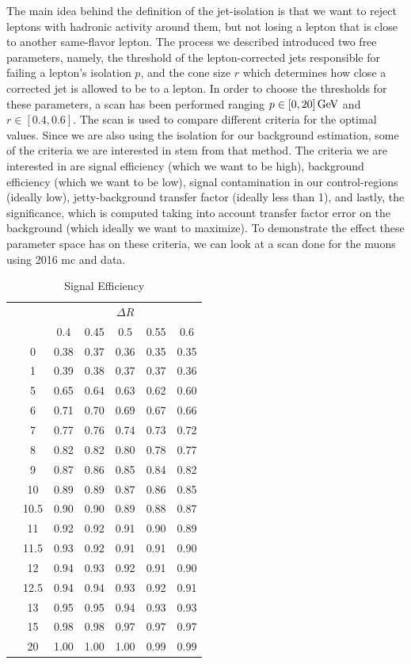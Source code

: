 The main idea behind the definition of the jet-isolation is that we want to reject leptons with hadronic activity around them, but not losing a lepton that is close to another same-flavor lepton. The process we described introduced two free parameters, namely, the \pt threshold of the lepton-corrected jets responsible for failing a lepton's isolation $p$, and the cone size $r$ which determines how close a corrected jet is allowed to be to a lepton. In order to choose the thresholds for these parameters, a scan has been performed ranging $p\in [0,20]\,\text{Ge\hspace{-.08em}V}$ and $r\in[0.4,0.6]$. The scan is used to compare different criteria for the optimal values. Since we are also using the isolation for our background estimation, some of the criteria we are interested in stem from that method. The criteria we are interested in are signal efficiency (which we want to be high), background efficiency (which we want to be low), signal contamination in our control-regions (ideally low), jetty-background transfer factor (ideally less than 1), and lastly, the significance, which is computed taking into account transfer factor error on the background (which ideally we want to maximize). To demonstrate the effect these parameter space has on these criteria, we can look at a scan done for the muons using 2016 \gls{mc} and data.

\begin{table}[!htb]
	\centering
	\label{tab:iso-scan-signal-efficiency}
		\caption{Signal Efficiency}
			\begin{tabular}{cc|ccccc}
    			&\multicolumn{1}{c}{} & \multicolumn{5}{c}{$\Delta R$} \\
    && 0.4 & 0.45 & 0.5 & 0.55 & 0.6 \\
    \cline{2-7}
    & 0 & 0.38 & 0.37 & 0.36 & 0.35 & 0.35 \\
& 1 & 0.39 & 0.38 & 0.37 & 0.37 & 0.36 \\
& 5 & 0.65 & 0.64 & 0.63 & 0.62 & 0.60 \\
& 6 & 0.71 & 0.70 & 0.69 & 0.67 & 0.66 \\
& 7 & 0.77 & 0.76 & 0.74 & 0.73 & 0.72 \\
& 8 & 0.82 & 0.82 & 0.80 & 0.78 & 0.77 \\
\smash{\rotatebox[origin=c]{90}{\pt}} & 9 & 0.87 & 0.86 & 0.85 & 0.84 & 0.82 \\
& 10 & 0.89 & 0.89 & 0.87 & 0.86 & 0.85 \\
& 10.5 & 0.90 & 0.90 & 0.89 & 0.88 & 0.87 \\
& 11 & 0.92 & 0.92 & 0.91 & 0.90 & 0.89 \\
& 11.5 & 0.93 & 0.92 & 0.91 & 0.91 & 0.90 \\
& 12 & 0.94 & 0.93 & 0.92 & 0.91 & 0.90 \\
& 12.5 & 0.94 & 0.94 & 0.93 & 0.92 & 0.91 \\
& 13 & 0.95 & 0.95 & 0.94 & 0.93 & 0.93 \\
& 15 & 0.98 & 0.98 & 0.97 & 0.97 & 0.97 \\
& 20 & 1.00 & 1.00 & 1.00 & 0.99 & 0.99
  \end{tabular}
\end{table}

